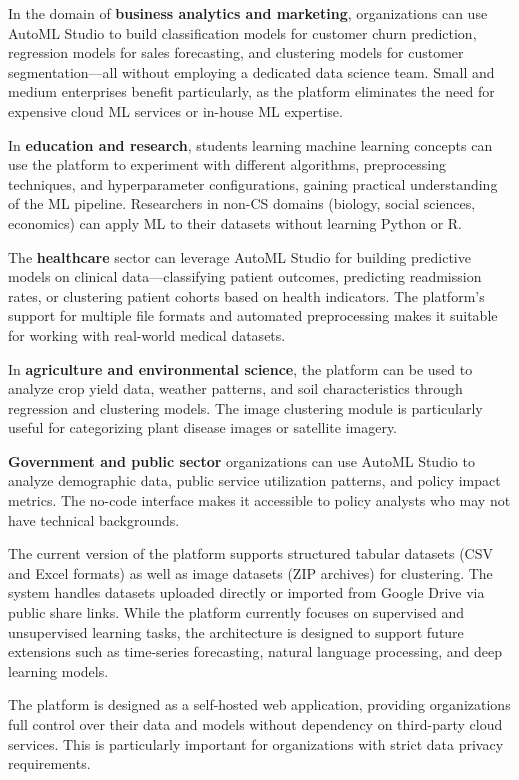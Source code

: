 \documentclass[12pt,a4paper]{report}
\begin{document}
In the domain of \textbf{business analytics and marketing}, organizations can use AutoML Studio to build classification models for customer churn prediction, regression models for sales forecasting, and clustering models for customer segmentation—all without employing a dedicated data science team. Small and medium enterprises benefit particularly, as the platform eliminates the need for expensive cloud ML services or in-house ML expertise.

In \textbf{education and research}, students learning machine learning concepts can use the platform to experiment with different algorithms, preprocessing techniques, and hyperparameter configurations, gaining practical understanding of the ML pipeline. Researchers in non-CS domains (biology, social sciences, economics) can apply ML to their datasets without learning Python or R.

The \textbf{healthcare} sector can leverage AutoML Studio for building predictive models on clinical data—classifying patient outcomes, predicting readmission rates, or clustering patient cohorts based on health indicators. The platform's support for multiple file formats and automated preprocessing makes it suitable for working with real-world medical datasets.

In \textbf{agriculture and environmental science}, the platform can be used to analyze crop yield data, weather patterns, and soil characteristics through regression and clustering models. The image clustering module is particularly useful for categorizing plant disease images or satellite imagery.

\textbf{Government and public sector} organizations can use AutoML Studio to analyze demographic data, public service utilization patterns, and policy impact metrics. The no-code interface makes it accessible to policy analysts who may not have technical backgrounds.

The current version of the platform supports structured tabular datasets (CSV and Excel formats) as well as image datasets (ZIP archives) for clustering. The system handles datasets uploaded directly or imported from Google Drive via public share links. While the platform currently focuses on supervised and unsupervised learning tasks, the architecture is designed to support future extensions such as time-series forecasting, natural language processing, and deep learning models.

The platform is designed as a self-hosted web application, providing organizations full control over their data and models without dependency on third-party cloud services. This is particularly important for organizations with strict data privacy requirements.
\end{document}
